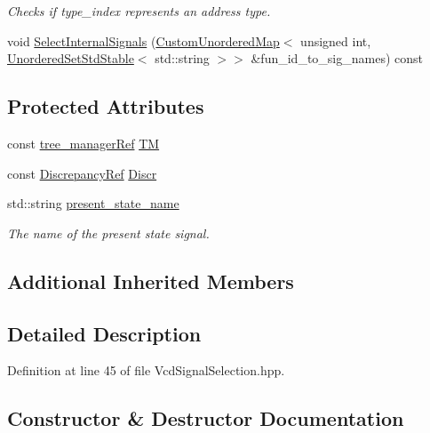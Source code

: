 \begin{DoxyCompactItemize}
\begin{DoxyCompactList}\small\item\em Checks if type\+\_\+index represents an address type. \end{DoxyCompactList}\item 
void \hyperlink{classVcdSignalSelection_a54478a4fe3af6bfed3b3a12e284b4d9e}{Select\+Internal\+Signals} (\hyperlink{custom__map_8hpp_ad1ed68f2ff093683ab1a33522b144adc}{Custom\+Unordered\+Map}$<$ unsigned int, \hyperlink{custom__set_8hpp_a1f63d303cef2790dc0a0ff7feae38f83}{Unordered\+Set\+Std\+Stable}$<$ std\+::string $>$$>$ \&fun\+\_\+id\+\_\+to\+\_\+sig\+\_\+names) const
\end{DoxyCompactItemize}
\subsection*{Protected Attributes}
\begin{DoxyCompactItemize}
\item 
const \hyperlink{tree__manager_8hpp_a96ff150c071ce11a9a7a1e40590f205e}{tree\+\_\+manager\+Ref} \hyperlink{classVcdSignalSelection_a15ef09f9d7db919e05d546dfb90b5d6a}{TM}
\item 
const \hyperlink{Discrepancy_8hpp_a9fb5a8938b4eeaafdaf7707f583f0193}{Discrepancy\+Ref} \hyperlink{classVcdSignalSelection_a0c74cd3db4812664f09c33f4d931aadb}{Discr}
\item 
std\+::string \hyperlink{classVcdSignalSelection_a386b41b66fbcf0ec332362c60f57b734}{present\+\_\+state\+\_\+name}
\begin{DoxyCompactList}\small\item\em The name of the present state signal. \end{DoxyCompactList}\end{DoxyCompactItemize}
\subsection*{Additional Inherited Members}


\subsection{Detailed Description}


Definition at line 45 of file Vcd\+Signal\+Selection.\+hpp.



\subsection{Constructor \& Destructor Documentation}
\mbox{\label{classVcdSignalSelection_ae5930280205726a0f940b7fd2a4801bc}} 
